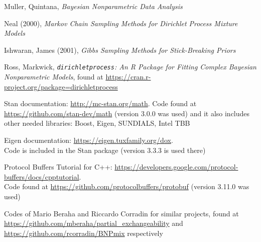 \begin{thebibliography}{9}
 Muller, Quintana, \textit{Bayesian Nonparametric Data Analysis}

 Neal (2000), \textit{Markov Chain Sampling Methods for Dirichlet Process Mixture Models}

 Ishwaran, James (2001), \textit{Gibbs Sampling Methods for Stick-Breaking Priors}

 Ross, Markwick, \textit{\texttt{dirichletprocess}: An R Package for Fitting Complex Bayesian Nonparametric Models}, found at \url{https://cran.r-project.org/package=dirichletprocess}

 Stan documentation: \url{http://mc-stan.org/math}.
Code found at \url{https://github.com/stan-dev/math} (version 3.0.0 was used) and it also includes other needed libraries: Boost, Eigen, SUNDIALS, Intel TBB

 Eigen documentation: \url{https://eigen.tuxfamily.org/dox}. \\
Code is included in the Stan package (version 3.3.3 is used there)

 Protocol Buffers Tutorial for C++: \url{https://developers.google.com/protocol-buffers/docs/cpptutorial}. \\
Code found at \url{https://github.com/protocolbuffers/protobuf} (version 3.11.0 was used)

 Codes of Mario Beraha and Riccardo Corradin for similar projects, found at \url{https://github.com/mberaha/partial_exchangeability} and \url{https://github.com/rcorradin/BNPmix} respectively
\end{thebibliography}
